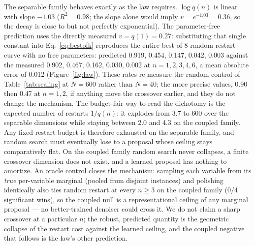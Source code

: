 \documentclass[11pt]{article}
\begin{document}
The separable family behaves exactly as the law requires. $\log q(n)$ is linear with slope
$-1.03$ ($R^2 = 0.98$; the slope alone would imply $v = e^{-1.03} = 0.36$, so the decay is
close to but not perfectly exponential). The parameter-free prediction uses the directly
measured $v = q(1) = 0.27$: substituting that single constant into
Eq.~\eqref{eq:bestofk} reproduces the entire best-of-8 random-restart curve with no free
parameters: predicted 0.919, 0.454, 0.147, 0.042, 0.003 against the measured 0.902, 0.467,
0.162, 0.030, 0.002 at $n = 1, 2, 3, 4, 6$, a mean absolute error of 0.012
(Figure~\ref{fig:law}). These rates re-measure the random control of Table~\ref{tab:scaling}
at $N = 600$ rather than $N = 40$; the more precise values, 0.90 then 0.47 at $n = 1, 2$, if
anything move the crossover earlier, and they do not change the mechanism. The budget-fair
way to read the dichotomy is the expected number of restarts $1/q(n)$: it explodes from 3.7
to 600 over the separable dimensions while staying between 2.0 and 4.3 on the coupled family.
Any fixed restart budget is therefore exhausted on the separable family, and random search
must eventually lose to a proposal whose ceiling stays comparatively flat. On the coupled
family random search never collapses, a finite crossover dimension does not exist, and a
learned proposal has nothing to amortize. An oracle control closes the mechanism: sampling
each variable from its \emph{true} per-variable marginal (pooled from disjoint instances) and
polishing identically also ties random restart at every $n \ge 3$ on the coupled family (0/4
significant wins), so the coupled null is a representational ceiling of any marginal
proposal --- no better-trained denoiser could cross it. We do not claim a sharp crossover at a particular
$n$; the robust, predicted quantity is the geometric collapse of the restart cost against the
learned ceiling, and the coupled negative that follows is the law's other prediction.
\end{document}
